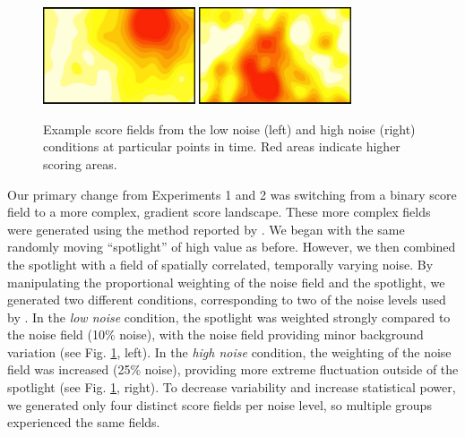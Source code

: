 \documentclass[12pt,letterpaper]{article}
\begin{document}
\begin{figure}
  \centering
  \includegraphics[width=0.4\textwidth]{./figures/easy-field}
  \hspace{0.1cm}
  \includegraphics[width=0.4\textwidth]{./figures/medium-field}
  \caption{Example score fields from the low noise (left) and high noise (right) conditions at particular points in time.  Red areas indicate higher scoring areas.}
  \label{fig:score_exp3}
\end{figure}


Our primary change from Experiments 1 and 2 was switching from a binary score field to a more complex, gradient score landscape.
These more complex fields were generated using the method reported by . 
We began with the same randomly moving ``spotlight'' of high value as before. 
However, we then combined the spotlight with a field of spatially correlated, temporally varying noise.  
By manipulating the proportional weighting of the noise field and the spotlight, we generated two different conditions, corresponding to two of the noise levels used by \citeauthor{berdahl_emergent_2013}. 
In the \emph{low noise} condition, the spotlight was weighted strongly compared to the noise field (10\% noise), with the noise field providing minor background variation (see Fig. \ref{fig:score_exp3}, left). 
In the \emph{high noise} condition, the weighting of the noise field was increased (25\% noise), providing more extreme fluctuation outside of the spotlight (see Fig. \ref{fig:score_exp3}, right).
To decrease variability and increase statistical power, we generated only four distinct score fields per noise level, so multiple groups experienced the same fields.  
\end{document}
